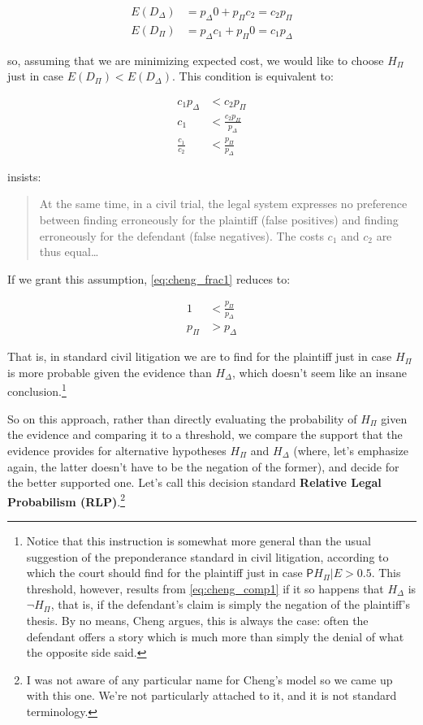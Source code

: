 \documentclass[10pt,dvipsnames,enabledeprecatedfontcommands]{scrartcl}
\newcommand{\n}{\neg}
\newcommand{\pr}{\mathsf{P}}
\begin{document}
\begin{align*}
E(D_\Delta) & = p_\Delta 0 + p_\Pi c_2 = c_2p_\Pi\\
E(D_\Pi) & = p_\Delta c_1 + p_\Pi 0 = c_1 p_\Delta
\end{align*}

\noindent so, assuming that we are minimizing expected cost, we would
like to choose \(H_\Pi\) just in case \(E(D_\Pi) < E(D_\Delta)\). This
condition is equivalent to:

\begin{align}
\nonumber c_1p_\Delta &< c_2p_\Pi \\
\nonumber c_1 & < \frac{c_2p_\Pi}{p_\Delta}\\
\label{eq:cheng_frac1}\frac{c_1}{c_2} & < \frac{p_\Pi}{p_\Delta}
\end{align}

 insists:

\begin{quote}
At the same time, in a civil trial, the legal system expresses no preference between finding erroneously for the plaintiff (false positives) and finding erroneously for the defendant (false negatives). The costs $c_1$ and $c_2$ are thus equal\dots
\end{quote}

\noindent If we grant this assumption, \eqref{eq:cheng_frac1} reduces
to:

\begin{align}
\nonumber 1 &< \frac{p_\Pi}{p_\Delta} \\
\label{eq:cheng_comp1} p_\Pi &> p_\Delta 
\end{align}

\noindent That is, in standard civil litigation we are to find for the
plaintiff just in case \(H_\Pi\) is more probable given the evidence
than \(H_\Delta\), which doesn't seem like an insane
conclusion.\footnote{Notice that this instruction is somewhat more general than the usual suggestion of the preponderance standard in civil litigation,  according to which the court should find for the plaintiff just in case $\pr{H_\Pi\vert E} >0.5$. This threshold, however, results from \eqref{eq:cheng_comp1} if it so happens that $H_\Delta$ is $\n H_\Pi$, that is, if the defendant's claim is simply the negation of the plaintiff's thesis.  By no means, Cheng argues, this is always the case: often the defendant offers a story which is much more than simply the denial of what the opposite side said.}

So on this approach, rather than directly evaluating the probability of
\(H_\Pi\) given the evidence and comparing it to a threshold, we compare
the support that the evidence provides for alternative hypotheses
\(H_\Pi\) and \(H_\Delta\) (where, let's emphasize again, the latter
doesn't have to be the negation of the former), and decide for the
better supported one. Let's call this decision standard
\textbf{Relative Legal Probabilism (RLP)}.\footnote{I was not aware of any particular name for Cheng's model so we came up with this one. We're not particularly attached to it, and it is not standard terminology.}
\end{document}
